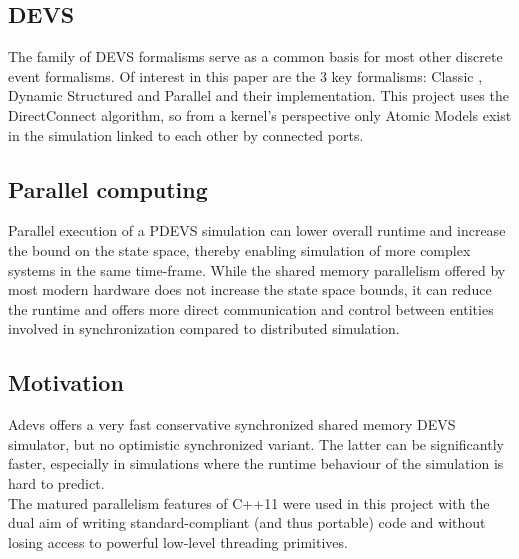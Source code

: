 \subsection{DEVS}
The family of DEVS \cite{DEVSbase} formalisms serve as a common basis for most other discrete event formalisms. Of interest in this paper are the 3 key formalisms: Classic \cite{ClassicDEVS}, Dynamic Structured \cite{DSDEVS} and Parallel \cite{ParallelDEVS} and their implementation. This project uses the DirectConnect \cite{SymbolicFlattening} algorithm, so from a kernel's perspective only Atomic Models exist in the simulation linked to each other by connected ports.

\subsection{Parallel computing}
Parallel execution of a PDEVS simulation can lower overall runtime and increase the bound on the state space, thereby enabling simulation of more complex systems in the same time-frame.
While the shared memory parallelism offered by most modern hardware does not increase the state space bounds, it can reduce the runtime and offers more direct communication and control between entities involved in synchronization compared to distributed simulation. \\

\subsection{Motivation}
Adevs \cite{adevs} offers a very fast conservative synchronized shared memory DEVS simulator, but no optimistic synchronized variant. 
The latter can be significantly faster, especially in simulations where the runtime behaviour of the simulation is hard to predict. \\
The matured parallelism features of C++11 were used in this project with the dual aim of writing standard-compliant (and thus portable) code and without losing access to powerful low-level threading primitives. %

